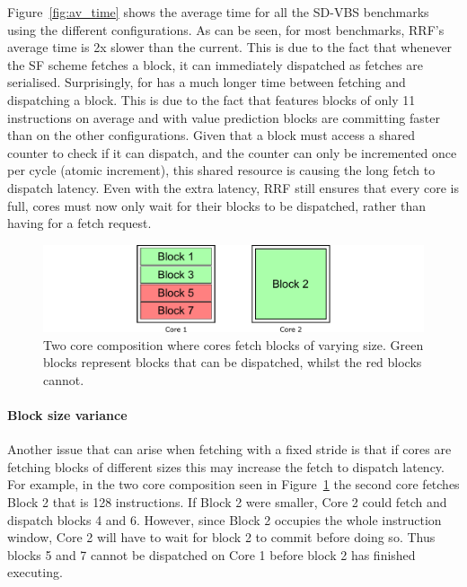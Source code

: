 Figure~\ref{fig:av_time} shows the average time for all the SD-VBS benchmarks using the different configurations.
As can be seen, for most benchmarks, RRF's average time is 2x slower than the current.
This is due to the fact that whenever the SF scheme fetches a block, it can immediately dispatched as fetches are serialised.
Surprisingly,  for \nfvp{} has a much longer time between fetching and dispatching a block.
This is due to the fact that  features blocks of only 11 instructions on average and with value prediction blocks are committing faster than on the other configurations.
Given that a block must access a shared counter to check if it can dispatch, and the counter can only be incremented once per cycle (atomic increment), this shared resource is causing the long fetch to dispatch latency.
Even with the extra latency, RRF still ensures that every core is full, cores must now only wait for their blocks to be dispatched, rather than having for a fetch request.

\begin{figure}[t]
    \centering
    \includegraphics[width=1\textwidth]{chapter3/graphics/fetch_ex.pdf}
    \caption{Two core composition where cores fetch blocks of varying size. Green blocks represent blocks that can be dispatched, whilst the red blocks cannot.}
    \label{fig:var_ex}
	\vspace{1em}
\end{figure}

\paragraph*{Block size variance}
Another issue that can arise when fetching with a fixed stride is that if cores are fetching blocks of different sizes this may increase the fetch to dispatch latency.
For example, in the two core composition seen in Figure~\ref{fig:var_ex} the second core fetches Block 2 that is 128 instructions.
If Block 2 were smaller, Core 2 could fetch and dispatch blocks 4 and 6.
However, since Block 2 occupies the whole instruction window, Core 2 will have to wait for block 2 to commit before doing so.
Thus blocks 5 and 7 cannot be dispatched on Core 1 before block 2 has finished executing.

